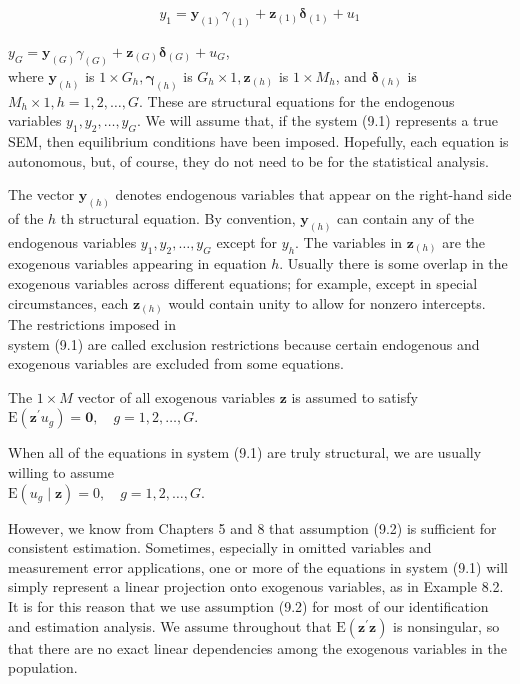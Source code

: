\documentclass[10pt]{article}
\begin{document}
\begin{equation*}
y_{1}=\mathbf{y}_{(1)} \gamma_{(1)}+\mathbf{z}_{(1)} \boldsymbol{\delta}_{(1)}+u_{1} \tag{9.1}
\end{equation*}


$y_{G}=\mathbf{y}_{(G)} \gamma_{(G)}+\mathbf{z}_{(G)} \boldsymbol{\delta}_{(G)}+u_{G}$,\\
where $\mathbf{y}_{(h)}$ is $1 \times G_{h}, \boldsymbol{\gamma}_{(h)}$ is $G_{h} \times 1, \mathbf{z}_{(h)}$ is $1 \times M_{h}$, and $\boldsymbol{\delta}_{(h)}$ is $M_{h} \times 1, h=1,2, \ldots, G$. These are structural equations for the endogenous variables $y_{1}, y_{2}, \ldots, y_{G}$. We will assume that, if the system (9.1) represents a true SEM, then equilibrium conditions have been imposed. Hopefully, each equation is autonomous, but, of course, they do not need to be for the statistical analysis.

The vector $\mathbf{y}_{(h)}$ denotes endogenous variables that appear on the right-hand side of the $h$ th structural equation. By convention, $\mathbf{y}_{(h)}$ can contain any of the endogenous variables $y_{1}, y_{2}, \ldots, y_{G}$ except for $y_{h}$. The variables in $\mathbf{z}_{(h)}$ are the exogenous variables appearing in equation $h$. Usually there is some overlap in the exogenous variables across different equations; for example, except in special circumstances, each $\mathbf{z}_{(h)}$ would contain unity to allow for nonzero intercepts. The restrictions imposed in\\
system (9.1) are called exclusion restrictions because certain endogenous and exogenous variables are excluded from some equations.

The $1 \times M$ vector of all exogenous variables $\mathbf{z}$ is assumed to satisfy\\
$\mathrm{E}\left(\mathbf{z}^{\prime} u_{g}\right)=\mathbf{0}, \quad g=1,2, \ldots, G$.

When all of the equations in system (9.1) are truly structural, we are usually willing to assume\\
$\mathrm{E}\left(u_{g} \mid \mathbf{z}\right)=0, \quad g=1,2, \ldots, G$.

However, we know from Chapters 5 and 8 that assumption (9.2) is sufficient for consistent estimation. Sometimes, especially in omitted variables and measurement error applications, one or more of the equations in system (9.1) will simply represent a linear projection onto exogenous variables, as in Example 8.2. It is for this reason that we use assumption (9.2) for most of our identification and estimation analysis. We assume throughout that $\mathrm{E}\left(\mathbf{z}^{\prime} \mathbf{z}\right)$ is nonsingular, so that there are no exact linear dependencies among the exogenous variables in the population.
\end{document}
